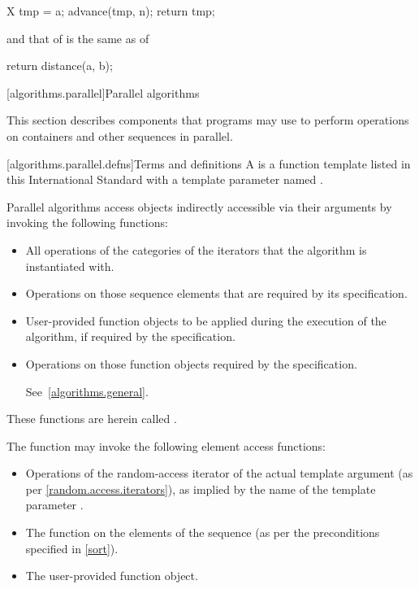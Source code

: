\begin{codeblock}
X tmp = a;
advance(tmp, n);
return tmp;
\end{codeblock}

and that of
is the same as of

\begin{codeblock}
return distance(a, b);
\end{codeblock}

[algorithms.parallel]{Parallel algorithms}

\pnum
This section describes components that \Cpp{} programs may use to perform
operations on containers and other sequences in parallel.

[algorithms.parallel.defns]{Terms and definitions}
\pnum
A  is a function template listed in this International Standard with
a template parameter named .

\pnum
Parallel algorithms access objects indirectly accessible via their arguments by
invoking the following functions:

\begin{itemize}
\item
All operations of the categories of the iterators that the algorithm is
instantiated with.

\item
Operations on those sequence elements that are required by its specification.

\item
User-provided function objects to be applied during the execution of the
algorithm, if required by the specification.

\item
Operations on those function objects required by the specification.
\begin{note} See~\ref{algorithms.general}.\end{note}
\end{itemize}

These functions are herein called .
\begin{example}
The  function may invoke the following element access functions:

\begin{itemize}
\item
Operations of the random-access iterator of the actual template argument
(as per \ref{random.access.iterators}),
as implied by the name of the template parameter .

\item
The  function on the elements of the sequence (as per the
preconditions specified in \ref{sort}).

\item
The user-provided  function object.
\end{itemize}
\end{example}

